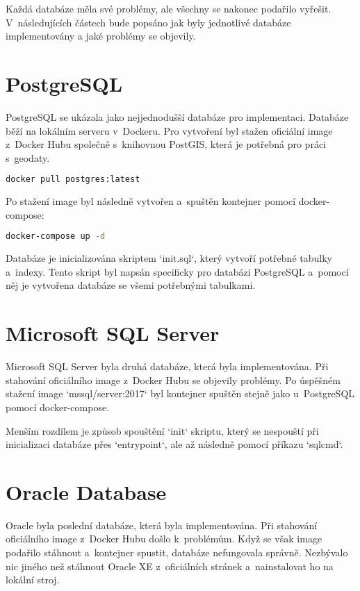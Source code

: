 Každá databáze měla své problémy, ale všechny se nakonec podařilo vyřešit.  
V~následujících částech bude popsáno jak byly jednotlivé databáze implementovány a jaké problémy se objevily.

\section{PostgreSQL}
PostgreSQL se ukázala jako nejjednodušší databáze pro implementaci.  
Databáze běží na lokálním serveru v~Dockeru.  
Pro vytvoření byl stažen oficiální image z~Docker Hubu  
společně s~knihovnou PostGIS, která je potřebná pro práci s~geodaty.

\begin{lstlisting}[language=bash]
docker pull postgres:latest
\end{lstlisting}

Po stažení image byl následně vytvořen a~spuštěn kontejner pomocí docker-compose:

\begin{lstlisting}[language=bash]
docker-compose up -d
\end{lstlisting}

Databáze je inicializována skriptem `init.sql`, který vytvoří potřebné tabulky a~indexy.  
Tento skript byl napsán specificky pro databázi PostgreSQL a~pomocí něj je vytvořena databáze  
se všemi potřebnými tabulkami.

\section{Microsoft SQL Server}

Microsoft SQL Server byla druhá databáze, která byla implementována.  
Při stahování oficiálního image z~Docker Hubu se objevily problémy.  
Po úspěšném stažení image `mssql/server:2017` byl kontejner spuštěn stejně jako u~PostgreSQL  
pomocí docker-compose.

Menším rozdílem je způsob spouštění `init` skriptu, který se nespouští při inicializaci databáze  
přes `entrypoint`, ale až následně pomocí příkazu `sqlcmd`.

\newpage

\section{Oracle Database}
Oracle byla poslední databáze, která byla implementována.  
Při stahování oficiálního image z~Docker Hubu došlo k~problémům.  
Když se však image podařilo stáhnout a~kontejner spustit, databáze nefungovala správně.  
Nezbývalo nic jiného než stáhnout Oracle XE z~oficiálních stránek a~nainstalovat ho na lokální stroj.  

